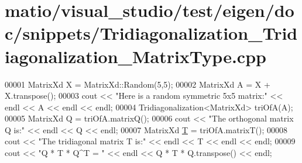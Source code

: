 \hypertarget{matio_2visual__studio_2test_2eigen_2doc_2snippets_2_tridiagonalization___tridiagonalization___matrix_type_8cpp_source}{}\section{matio/visual\+\_\+studio/test/eigen/doc/snippets/\+Tridiagonalization\+\_\+\+Tridiagonalization\+\_\+\+Matrix\+Type.cpp}
\label{matio_2visual__studio_2test_2eigen_2doc_2snippets_2_tridiagonalization___tridiagonalization___matrix_type_8cpp_source}

\begin{DoxyCode}
00001 MatrixXd X = MatrixXd::Random(5,5);
00002 MatrixXd A = X + X.transpose();
00003 cout << \textcolor{stringliteral}{"Here is a random symmetric 5x5 matrix:"} << endl << A << endl << endl;
00004 Tridiagonalization<MatrixXd> triOfA(A);
00005 MatrixXd Q = triOfA.matrixQ();
00006 cout << \textcolor{stringliteral}{"The orthogonal matrix Q is:"} << endl << Q << endl;
00007 MatrixXd \hyperlink{group___sparse_core___module_class_eigen_1_1_triplet}{T} = triOfA.matrixT();
00008 cout << \textcolor{stringliteral}{"The tridiagonal matrix T is:"} << endl << T << endl << endl;
00009 cout << \textcolor{stringliteral}{"Q * T * Q^T = "} << endl << Q * T * Q.transpose() << endl;
\end{DoxyCode}
